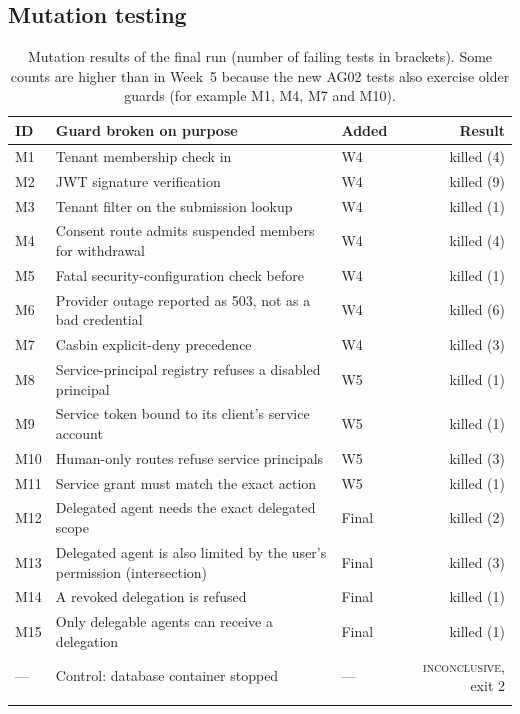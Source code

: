 \subsection{Mutation testing}
\begin{longtable}{@{}l P{8.4cm} P{2.0cm} r@{}}
\toprule
\textbf{ID} & \textbf{Guard broken on purpose} & \textbf{Added} & \textbf{Result}\\
\midrule
\endhead
M1 & Tenant membership check in  & W4 & killed (4)\\
M2 & JWT signature verification & W4 & killed (9)\\
M3 & Tenant filter on the submission lookup & W4 & killed (1)\\
M4 & Consent route admits suspended members for withdrawal & W4 & killed (4)\\
M5 & Fatal security-configuration check before  & W4 & killed (1)\\
M6 & Provider outage reported as 503, not as a bad credential & W4 & killed (6)\\
M7 & Casbin explicit-deny precedence & W4 & killed (3)\\
M8 & Service-principal registry refuses a disabled principal & W5 & killed (1)\\
M9 & Service token bound to its client's service account & W5 & killed (1)\\
M10 & Human-only routes refuse service principals & W5 & killed (3)\\
M11 & Service grant must match the exact action & W5 & killed (1)\\
M12 & Delegated agent needs the exact delegated scope & Final & killed (2)\\
M13 & Delegated agent is also limited by the user's permission (intersection) & Final & killed (3)\\
M14 & A revoked delegation is refused & Final & killed (1)\\
M15 & Only delegable agents can receive a delegation & Final & killed (1)\\
\midrule
--- & Control: database container stopped & --- & \textsc{inconclusive}, exit 2\\
\bottomrule
\caption{Mutation results of the final run (number of failing tests in brackets). Some counts are higher than in Week~5 because the new AG02 tests also exercise older guards (for example M1, M4, M7 and M10).}
\label{tab:mutations}
\end{longtable}


